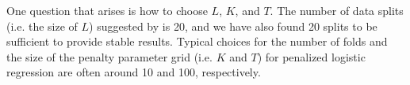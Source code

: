 
One question that arises is how to choose $L$, $K$, and $T$.  The number of data
splits (i.e. the size of $L$) suggested by \cite{fan2016} is 20, and we have
also found 20 splits to be sufficient to provide stable results.  Typical
choices for the number of folds and the size of the penalty parameter grid
(i.e. $K$ and $T$) for penalized logistic regression are often around 10 and
100, respectively.




